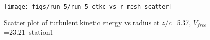 \begin{figure}[H]
\centering
\texttt{[image: figs/run\_5/run\_5\_ctke\_vs\_r\_mesh\_scatter]}
\caption{Scatter plot of turbulent kinetic energy vs radius at $z/c$=5.37, $V_{free}$=23.21, station1}
\label{fig:run_5_ctke_vs_r_mesh_scatter}
\end{figure}


